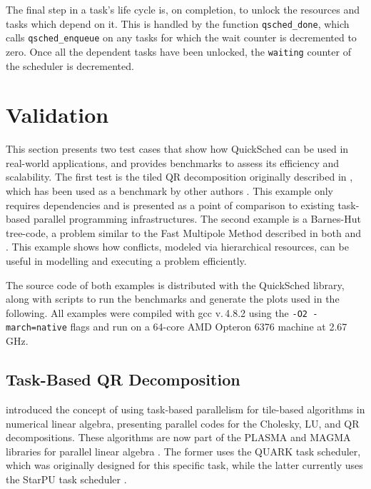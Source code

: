 \documentclass[fleqn,10pt]{wlpeerj}
\begin{document}
The final step in a task's life cycle is, on completion,
to unlock the resources and tasks which depend on it.
This is handled by the function {\tt qsched\_done}, which
calls {\tt qsched\_enqueue} on any tasks for which the
wait counter is decremented to zero.
Once all the dependent tasks have been unlocked, the
{\tt waiting} counter of the scheduler is decremented.


\section{Validation}

This section presents two test cases that show
how QuickSched can be used in real-world applications, and
provides benchmarks to assess its efficiency and scalability.
The first test is the tiled QR decomposition originally
described in \cite{ref:Buttari2009}, which has been used as a benchmark
by other authors \citep{ref:Agullo2009b,ref:Badia2009,ref:Bosilca2012}.
This example only requires dependencies and is presented 
as a point of comparison to existing task-based parallel
programming infrastructures.
The second example is a Barnes-Hut tree-code, a problem
similar to the Fast Multipole Method described in both
\cite{ref:Ltaief2012} and \cite{ref:Agullo2013}.
This example shows how conflicts, modeled
via hierarchical resources, can be useful in modelling and executing
a problem efficiently.

The source code of both examples is distributed with the
QuickSched library, along with scripts to run the benchmarks
and generate the plots used in the following.
All examples were compiled with gcc v.\,4.8.2 using the
{\tt -O2 -march=native} flags and run on
a 64-core AMD Opteron 6376 machine at 2.67\,GHz.


\subsection{Task-Based QR Decomposition}

\cite{ref:Buttari2009} introduced the concept of using task-based
parallelism for tile-based algorithms in numerical linear algebra,
presenting parallel codes for the Cholesky, LU, and QR
decompositions.
These algorithms are now part of the PLASMA and MAGMA
libraries for parallel linear algebra \citep{ref:Agullo2009}.
The former uses the QUARK task scheduler, which was originally
designed for this specific task, while the latter currently uses
the StarPU task scheduler \citep{ref:Agullo2011}.
\end{document}
